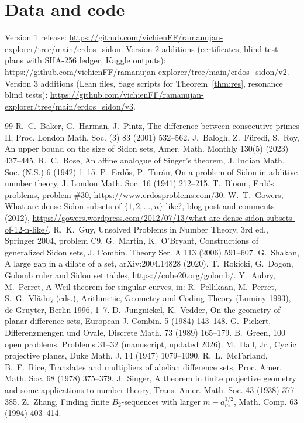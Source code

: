 \documentclass[11pt]{article}
\begin{document}
\section*{Data and code}
Version 1 release: \url{https://github.com/vichienFF/ramanujan-explorer/tree/main/erdos_sidon}. Version 2 additions (certificates,
blind-test plans with SHA-256 ledger, Kaggle outputs): \url{https://github.com/vichienFF/ramanujan-explorer/tree/main/erdos_sidon/v2}. Version 3 additions (Lean files, Sage scripts for Theorem~\ref{thm:res}, resonance blind tests): \url{https://github.com/vichienFF/ramanujan-explorer/tree/main/erdos_sidon/v3}.

\begin{thebibliography}{99}
 R.~C.~Baker, G.~Harman, J.~Pintz, The difference between consecutive primes II, Proc. London Math. Soc. (3) 83 (2001) 532--562.
 J.~Balogh, Z.~F\"uredi, S.~Roy, An upper bound on the size of Sidon sets, Amer. Math. Monthly 130(5) (2023) 437--445.
 R.~C.~Bose, An affine analogue of Singer's theorem, J. Indian Math. Soc. (N.S.) 6 (1942) 1--15.
 P.~Erd\H{o}s, P.~Tur\'an, On a problem of Sidon in additive number theory, J. London Math. Soc. 16 (1941) 212--215.
 T.~Bloom, Erd\H{o}s problems, problem \#30, \url{https://www.erdosproblems.com/30}.
 W.~T.~Gowers, What are dense Sidon subsets of $\{1,2,\dots,n\}$ like?, blog post and comments (2012),
\url{https://gowers.wordpress.com/2012/07/13/what-are-dense-sidon-subsets-of-12-n-like/}.
 R.~K.~Guy, Unsolved Problems in Number Theory, 3rd ed., Springer 2004, problem C9.
 G.~Martin, K.~O'Bryant, Constructions of generalized Sidon sets, J. Combin. Theory Ser. A 113 (2006) 591--607.
 G.~Shakan, A large gap in a dilate of a set, arXiv:2004.14828 (2020).
 T.~Rokicki, G.~Dogon, Golomb ruler and Sidon set tables, \url{https://cube20.org/golomb/}.
 Y.~Aubry, M.~Perret, A Weil theorem for singular curves, in: R.~Pellikaan, M.~Perret, S.~G.~Vl\u{a}du\c{t} (eds.), Arithmetic, Geometry and Coding Theory (Luminy 1993), de Gruyter, Berlin 1996, 1--7.
 D.~Jungnickel, K.~Vedder, On the geometry of planar difference sets, European J. Combin. 5 (1984) 143--148.
 G.~Pickert, Differenzmengen und Ovale, Discrete Math. 73 (1989) 165--179.
 B.~Green, 100 open problems, Problems 31--32 (manuscript, updated 2026).
 M.~Hall, Jr., Cyclic projective planes, Duke Math. J. 14 (1947) 1079--1090.
 R.~L.~McFarland, B.~F.~Rice, Translates and multipliers of abelian difference sets, Proc. Amer. Math. Soc. 68 (1978) 375--379.
 J.~Singer, A theorem in finite projective geometry and some applications to number theory, Trans. Amer. Math. Soc. 43 (1938) 377--385.
 Z.~Zhang, Finding finite $B_2$-sequences with larger $m-a_m^{1/2}$, Math. Comp. 63 (1994) 403--414.
\end{thebibliography}
\end{document}
